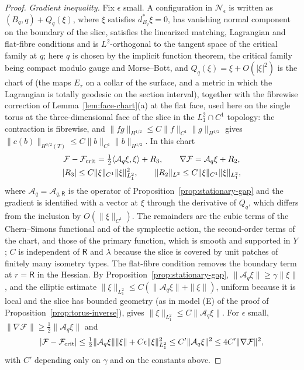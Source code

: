 \documentclass[11pt]{amsart}
\theoremstyle{definition}
\theoremstyle{remark}
\theoremstyle{plain}
\numberwithin{equation}{section}
\begin{document}
\begin{proof}
\emph{Gradient inequality.} Fix $\epsilon$ small. A configuration in $\mathcal N_\epsilon$ is written
as $(B_q,q)+Q_q(\xi)$, where $\xi$ satisfies $d^*_{B_q}\xi=0$, has vanishing normal component on
the boundary of the slice, satisfies the linearized matching, Lagrangian and flat-fibre
conditions and is $L^2$-orthogonal to the tangent space of the critical family at $q$; here $q$
is chosen by the implicit function theorem, the critical family being compact modulo gauge
and Morse--Bott, and $Q_q(\xi)=\xi+O(|\xi|^2)$ is the chart of \cite[Section~4.1]{DFL} (the maps
$E_\tau$ on a collar of the surface, and a metric in which the Lagrangian is totally geodesic
on the section interval), together with the fibrewise correction of
Lemma~\ref{lem:face-chart}(a) at the flat face, used here on the single torus at the
three-dimensional face of the slice in the $L^2_1\cap C^1$ topology: the contraction is
fibrewise, and $\|fg\|_{H^{1/2}}\le C\|f\|_{C^1}\|g\|_{H^{1/2}}$ gives
$\|c(b)\|_{H^{3/2}(T)}\le C\|b\|_{C^1}\|b\|_{H^{1/2}}$. In this chart
\begin{gather*}
\mathcal F-\mathcal F_{\rm crit}=\tfrac12\langle\mathcal A_q\xi,\xi\rangle+R_3,\qquad
\nabla\mathcal F=\mathcal A_q\xi+R_2,\\
|R_3|\le C\|\xi\|_{C^1}\|\xi\|_{L^2_1}^2,\qquad\|R_2\|_{L^2}\le C\|\xi\|_{C^1}\|\xi\|_{L^2_1},
\end{gather*}
where $\mathcal A_q=\mathcal A_{q,\mathsf R}$ is the operator of
Proposition~\ref{prop:stationary-gap} and the gradient is identified with a vector at $\xi$
through the derivative of $Q_q$, which differs from the inclusion by $O(\|\xi\|_{C^1})$. The
remainders are the cubic terms of the Chern--Simons functional and of the symplectic
action, the second-order terms of the chart, and those of the primary function, which is
smooth \cite[Section~6]{DFL} and supported in $Y$; $C$ is independent of $\mathsf R$ and $\lambda$
because the slice is covered by unit patches of finitely many isometry types. The
flat-fibre condition removes the boundary term at $r=\mathsf R$ in the Hessian. By
Proposition~\ref{prop:stationary-gap}, $\|\mathcal A_q\xi\|\ge\gamma\|\xi\|$, and the elliptic
estimate $\|\xi\|_{L^2_1}\le C(\|\mathcal A_q\xi\|+\|\xi\|)$, uniform because it is local and the slice has
bounded geometry (as in model (E) of the proof of Proposition~\ref{prop:torus-inverse}), gives $\|\xi\|_{L^2_1}\le C\|\mathcal A_q\xi\|$. For $\epsilon$
small, $\|\nabla\mathcal F\|\ge\frac12\|\mathcal A_q\xi\|$ and
\[
|\mathcal F-\mathcal F_{\rm crit}|\le\tfrac12\|\mathcal A_q\xi\|\|\xi\|+C\epsilon\|\xi\|^2_{L^2_1}
\le C'\|\mathcal A_q\xi\|^2\le4C'\|\nabla\mathcal F\|^2,
\]
with $C'$ depending only on $\gamma$ and on the constants above.


\end{proof}
\end{document}
